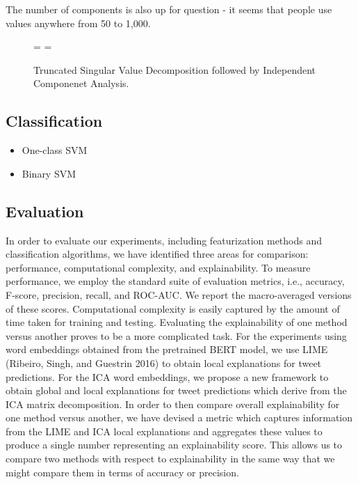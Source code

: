 \documentclass{article}
\begin{document}
The number of components is also up for question - it seems that people
use values anywhere from 50 to 1,000.

\begin{figure}
  \centering
   = 
   
  \newline
  \newline
  \newline
   = 
   
  \caption{Truncated Singular Value Decomposition followed by Independent Componenet Analysis.}
  \label{fig:matdec}
\end{figure}

\hypertarget{classification}{%
\subsection{Classification}\label{classification}}

\begin{itemize}
\tightlist
\item
  One-class SVM
\item
  Binary SVM
\end{itemize}

\hypertarget{evaluation}{%
\subsection{Evaluation}\label{evaluation}}

In order to evaluate our experiments, including featurization methods
and classification algorithms, we have identified three areas for
comparison: performance, computational complexity, and explainability.
To measure performance, we employ the standard suite of evaluation
metrics, i.e., accuracy, F-score, precision, recall, and ROC-AUC. We
report the macro-averaged versions of these scores. Computational
complexity is easily captured by the amount of time taken for training
and testing. Evaluating the explainability of one method versus another
proves to be a more complicated task. For the experiments using word
embeddings obtained from the pretrained BERT model, we use LIME
(Ribeiro, Singh, and Guestrin 2016) to obtain local explanations for
tweet predictions. For the ICA word embeddings, we propose a new
framework to obtain global and local explanations for tweet predictions
which derive from the ICA matrix decomposition. In order to then compare
overall explainability for one method versus another, we have devised a
metric which captures information from the LIME and ICA local
explanations and aggregates these values to produce a single number
representing an explainability score. This allows us to compare two
methods with respect to explainability in the same way that we might
compare them in terms of accuracy or precision.
\end{document}
